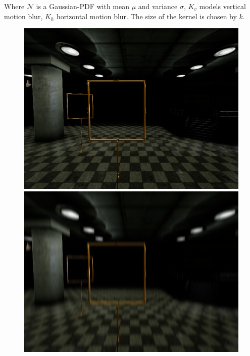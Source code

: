 Where $\mathcal{N}$ is a Gaussian-PDF with mean $\mu$ and variance $\sigma$,  $K_v$ models vertical motion blur, $K_h$ horizontal motion blur. The size of the kernel is chosen by $k$.

\begin{figure}[htbp]
	\begin{minipage}{0.33\textwidth}
		\includegraphics[width=\textwidth]{fig/gate_example}
	\end{minipage}
	\begin{minipage}{0.33\textwidth}
		\includegraphics[width=\textwidth]{fig/gate_example_motionblur_v}
	\end{minipage}
	\begin{minipage}{0.33\textwidth}

\end{minipage}
\end{figure}
